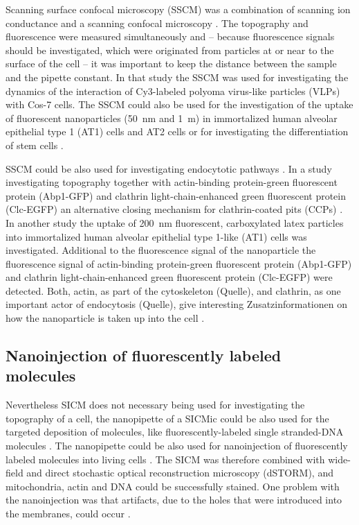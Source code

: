 Scanning surface confocal microscopy (SSCM) was a combination of scanning ion conductance and a 
scanning confocal microscopy \cite{Gorelik2002}. The topography and fluorescence were measured
simultaneously and -- because fluorescence signals should be investigated, which were originated
from particles at or near to the surface of the cell -- it was important to keep the distance 
between the sample and the pipette constant. In that study the SSCM was used for investigating the 
dynamics of the interaction of Cy3-labeled polyoma virus-like particles (VLPs) with Cos-7 cells. 
The SSCM could also be used for the investigation of the uptake of fluorescent nanoparticles 
(50~nm and 1~{\textmu}m) in immortalized human alveolar epithelial type 1 (AT1) cells and AT2 
cells \cite{Kemp2008} or for investigating the differentiation of stem cells \cite{Gorelik2008}.

SSCM could be also used for investigating endocytotic pathways \cite{Shevchuk2008}. In a study 
investigating topography together with actin-binding protein-green fluorescent protein (Abp1-GFP)
and clathrin light-chain-enhanced green fluorescent protein (Clc-EGFP) an alternative closing 
mechanism for clathrin-coated pits (CCPs) \cite{Shevchuk2012}. In another study the uptake of
200~nm fluorescent, carboxylated latex particles into immortalized human alveolar epithelial type
1-like (AT1) cells was investigated. Additional to the fluorescence signal of the nanoparticle the 
fluorescence signal of actin-binding protein-green fluorescent protein (Abp1-GFP) and clathrin
light-chain-enhanced green fluorescent protein (Clc-EGFP) were detected. Both, actin, as part of
the cytoskeleton (Quelle), and clathrin, as one important actor of endocytosis (Quelle), give 
interesting Zusatzinformationen on how the nanoparticle is taken up into the cell 
\cite{Novak2014}. 

\subsection{Nanoinjection of fluorescently labeled molecules}

Nevertheless SICM does not necessary being used for investigating the topography of a cell, 
the nanopipette of a SICMic could be also used for the targeted deposition of molecules, like 
fluorescently-labeled single stranded-DNA molecules \cite{Ying2002,Hennig2015}. The nanopipette 
could be also used for nanoinjection of fluorescently labeled molecules into living cells 
\cite{Hennig2015a}. The SICM was therefore combined with wide-field and direct stochastic 
optical reconstruction microscopy (dSTORM), and mitochondria, actin and DNA could be successfully 
stained. One problem with the nanoinjection was that artifacts, due to the holes that were 
introduced into the membranes, could occur \cite{Hennig2015a}.


